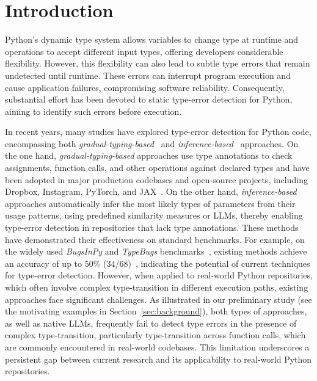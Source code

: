 \section{Introduction}
\label{sec:introduction}

Python's dynamic type system allows variables to change type at
runtime and operations to accept different input types, offering
developers considerable flexibility.
However, this flexibility can also lead to subtle type errors
that remain undetected until runtime.
These errors can interrupt program
execution and cause application failures, compromising software
reliability.
Consequently, substantial effort has been devoted
to static type-error detection for Python, aiming to identify
such errors before execution.

In recent years, many studies have explored type-error detection for Python
code, encompassing both \textit{gradual-typing-based}~\cite{mypy,pyrefly,pyright}
and \textit{inference-based}~\cite{oh2024pyinder,rTED} approaches.
On the one hand, \textit{gradual-typing-based} approaches use type annotations
to check assignments, function calls, and other operations against declared
types and have been adopted in major production codebases and open-source
projects, including Dropbox, Instagram, PyTorch, and
JAX~\cite{dropboxMypy,pyreflyAdoption}.
On the other hand, \textit{inference-based} approaches automatically infer
the most likely types of parameters from their usage patterns,
using predefined similarity measures or LLMs, thereby enabling
type-error detection in repositories that lack type annotations.
These methods have demonstrated their effectiveness on standard benchmarks.
For example, on the widely used \textit{BugsInPy} and \textit{TypeBugs}
benchmarks~\cite{bugsinpy,typebugs}, existing methods achieve an accuracy of up to
50\% (34/68)~\cite{oh2024pyinder}, indicating the potential of current
techniques for type-error detection.
However, when applied to real-world Python repositories, which often 
involve complex type-transition in different execution paths, 
existing approaches face significant challenges. 
As illustrated in our preliminary study (see the motivating examples in Section~\ref{sec:background}), 
both types of approaches, as well as native LLMs, frequently fail to detect type errors in the 
presence of complex type-transition, particularly type-transition across function calls, 
which are commonly encountered in real-world codebases. 
This limitation underscores a persistent gap between current research and its 
applicability to real-world Python repositories.

